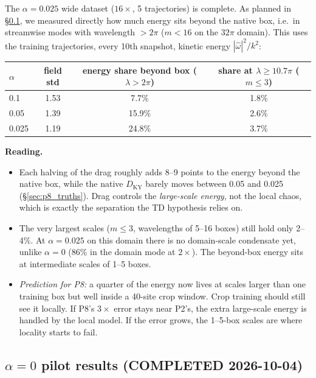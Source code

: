 \documentclass[11pt]{article}
\begin{document}
The $\alpha{=}0.025$ wide dataset ($16\times$, 5 trajectories) is
complete. As planned in \S\ref{sec:alpha0_results}, we measured
directly how much energy sits beyond the native box, i.e.\ in
streamwise modes with wavelength $>2\pi$ ($m<16$ on the $32\pi$ domain).
This uses the training trajectories, every 10th snapshot, kinetic energy
$|\hat\omega|^2/k^2$:
\begin{center}
\small
\begin{tabular}{lccc}
\toprule
$\alpha$ & field std & energy share beyond box ($\lambda>2\pi$) & share at $\lambda\ge 10.7\pi$ ($m\le3$) \\
\midrule
0.1 & 1.53 & 7.7\% & 1.8\% \\
0.05 & 1.39 & 15.9\% & 2.6\% \\
0.025 & 1.19 & 24.8\% & 3.7\% \\
\bottomrule
\end{tabular}
\end{center}
\textbf{Reading.}
\begin{itemize}[leftmargin=*]
\item Each halving of the drag roughly adds 8--9 points to the energy
  beyond the native box, while the native $D_{\mathrm{KY}}$ barely moves
  between 0.05 and 0.025 (\S\ref{sec:p8_truths}). Drag controls the
  \emph{large-scale energy}, not the local chaos, which is exactly the
  separation the TD hypothesis relies on.
\item The very largest scales ($m\le3$, wavelengths of 5--16 boxes)
  still hold only 2--4\%. At $\alpha{=}0.025$ on this domain there is no
  domain-scale condensate yet, unlike $\alpha{=}0$ (86\% in the domain
  mode at $2\times$). The beyond-box energy sits at intermediate scales
  of 1--5 boxes.
\item \emph{Prediction for P8:} a quarter of the energy now lives at
  scales larger than one training box but well inside a 40-site
  crop window. Crop training should still see it locally. If P8's
  $3\times$ error stays near P2's, the extra large-scale energy is
  handled by the local model. If the error grows, the 1--5-box scales
  are where locality starts to fail.
\end{itemize}

\subsection{$\alpha{=}0$ pilot results (COMPLETED 2026-10-04)}
\label{sec:alpha0_results}
\end{document}
